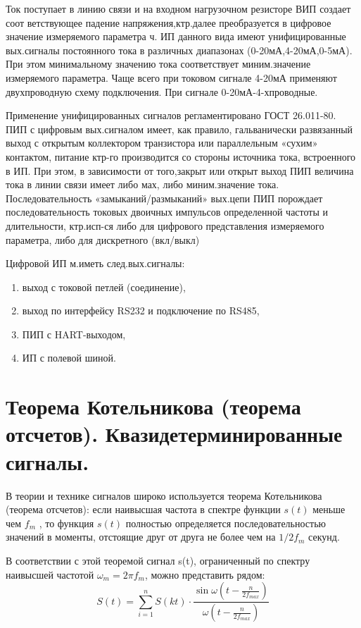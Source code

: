 \documentclass[unicode, 12pt, a4paper, oneside]{article}
\begin{document}
Ток поступает в линию связи и на входном нагрузочном резисторе ВИП создает соот ветствующее падение напряжения,ктр.далее преобразуется в цифровое значение измеряемого параметра ч. ИП данного вида имеют унифицированные вых.сигналы постоянного тока в различных диапазонах (0-20мА,4-20мА,0-5мА). При этом минимальному значению тока соответствует миним.значение измеряемого параметра. Чаще всего при токовом сигнале 4-20мА применяют двухпроводную схему подключения. При сигнале 0-20мА-4-хпроводные.

Применение унифицированных сигналов регламентировано ГОСТ 26.011-80. ПИП с цифровым вых.сигналом имеет, как правило, гальванически развязанный выход с открытым коллектором транзистора или параллельным «сухим» контактом, питание ктр-го производится со стороны источника тока, встроенного в ИП. При этом, в зависимости от того,закрыт или открыт выход ПИП величина тока в линии связи имеет либо мах, либо миним.значение тока. Последовательность «замыканий/размыканий» вых.цепи ПИП порождает последовательность токовых двоичных импульсов определенной частоты и длительности, ктр.исп-ся либо для цифрового представления измеряемого параметра, либо для дискретного (вкл/выкл)

Цифровой ИП м.иметь след.вых.сигналы:
\begin{enumerate}
\item выход с токовой петлей (соединение),
\item выход по интерфейсу RS232 и подключение по RS485,
\item ПИП с HART-выходом,
\item ИП с полевой шиной.
\end{enumerate}

\section{Теорема Котельникова (теорема отсчетов). Квазидетерминированные сигналы.}

В теории и технике сигналов широко используется теорема Котельникова (теорема отсчетов): если наивысшая частота в спектре функции $s(t)$ меньше чем $f_m$ , то функция $s(t)$ полностью определяется последовательностью значений в моменты, отстоящие друг от друга не более чем на $1/2 f_m$ секунд.

В соответствии с этой теоремой сигнал s(t), ограниченный по спектру наивысшей частотой $\omega_m = 2\pi f_m$, можно представить рядом:
\begin{displaymath}
S(t) = \sum_{i=1}^{n}S(kt) \cdot \frac{\sin \omega (t-\frac{n}{2 f_{max}}) }{\omega (t-\frac{n}{2 f_{max}})}
\end{displaymath}
 
\end{document}

